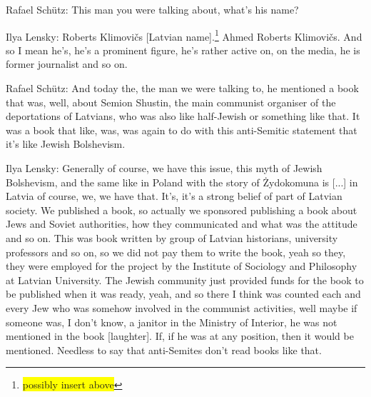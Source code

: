 Rafael Schütz: This man you were talking about, what’s his name? 

Ilya Lensky: Roberts Klimovičs [Latvian name].\footnote{\colorbox{yellow}{possibly insert above}} Ahmed Roberts Klimovičs. And so I mean he’s, he’s a prominent figure, he’s rather active on, on the media, he is former journalist and so on. 

Rafael Schütz: And today the, the man we were talking to, he mentioned a book that was, well, about Semion Shustin, the main communist organiser of the deportations of Latvians, who was also like half-Jewish or something like that. It was a book that like, was, was again to do with this anti-Semitic statement that it’s like Jewish Bolshevism. 

Ilya Lensky: Generally of course, we have this issue, this myth of Jewish Bolshevism, and the same like in Poland with the story of Żydokomuna is [...] in Latvia of course, we, we have that. It’s, it’s a strong belief of part of Latvian society. We published a book, so actually we sponsored publishing a book about Jews and Soviet authorities, how they communicated and what was the attitude and so on. This was book written by group of Latvian historians, university professors and so on, so we did not pay them to write the book, yeah so they, they were employed for the project by the Institute of Sociology and Philosophy at Latvian University. The Jewish community just provided funds for the book to be published when it was ready, yeah, and so there I think was counted each and every Jew who was somehow involved in the communist activities, well maybe if someone was, I don’t know, a janitor in the Ministry of Interior, he was not mentioned in the book [laughter]. If, if he was at any position, then it would be mentioned. Needless to say that anti-Semites don’t read books like that.\\
